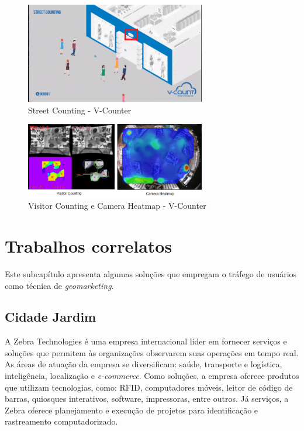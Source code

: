 \begin{figure}[htb]
  \caption{\label{v-count1}Street Counting - V-Counter}
  \begin{center}
    \includegraphics[width=0.70\textwidth]{img/v-count.png}
  \end{center}
\end{figure}

\begin{figure}[htb]
  \caption{\label{v-count2}Visitor Counting e Camera Heatmap - V-Counter}
  \begin{center}
    \includegraphics[width=0.70\textwidth]{img/termal-vcount.png}
  \end{center}
\end{figure}

\section{Trabalhos correlatos}
Este subcapítulo apresenta algumas soluções que
empregam o tráfego de usuários como técnica de \emph{geomarketing}.

\subsection{Cidade Jardim}
A Zebra Technologies é uma empresa internacional
líder em fornecer serviços e soluções que permitem às organizações observarem
suas operações em tempo real. As áreas de atuação da empresa se diversificam:
saúde, transporte e logística, inteligência, localização e \emph{e-commerce}.
Como soluções, a empresa oferece produtos que utilizam tecnologias, como: RFID,
computadores móveis, leitor de código de barras, quiosques interativos,
software, impressoras, entre outros. Já serviços, a Zebra oferece planejamento e
execução de projetos para identificação e rastreamento computadorizado.

